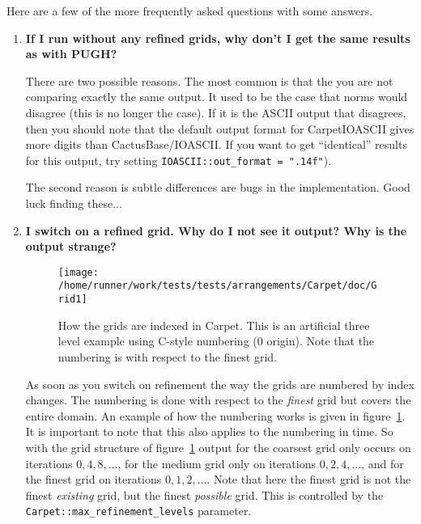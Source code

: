 Here are a few of the more frequently asked questions with some
answers.
\begin{enumerate}
\item \textbf{If I run without any refined grids, why don't I get the
    same results as with PUGH?}
  
  There are two possible reasons. The most common is that the you are
  not comparing exactly the same output. It used to be the case that
  norms would disagree (this is no longer the case). If it is the
  ASCII output that disagrees, then you should note that the default
  output format for CarpetIOASCII gives more digits than
  CactusBase/IOASCII. If you want to get ``identical'' results for
  this output, try setting \texttt{IOASCII::out\_format = ".14f"}).

  The second reason is subtle differences are bugs in the
  implementation. Good luck finding these...
\item \textbf{I switch on a refined grid. Why do I not see it output?
    Why is the output strange?} 

\begin{figure}[htbp]
  \begin{center}
    \texttt{[image: /home/runner/work/tests/tests/arrangements/Carpet/doc/Grid1]}
    \caption{How the grids are indexed in Carpet. This is an
      artificial three level example using C-style numbering (0
      origin). Note that the numbering is with respect to the finest
      grid.}
    \label{fig:Grid1}
  \end{center}
\end{figure}
  As soon as you switch on refinement the way the grids are numbered
  by index changes. The numbering is done with respect to the
  \textit{finest} grid but covers the entire domain. An example of how
  the numbering works is given in figure~\ref{fig:Grid1}. It is
  important to note that this also applies to the numbering in
  time. So with the grid structure of figure~\ref{fig:Grid1} output
  for the coarsest grid only occurs on iterations $0,4,8,\dots$, for
  the medium grid only on iterations $0,2,4,\dots$, and for the finest
  grid on iterations $0,1,2,\dots$. Note that here the finest grid is
  not the finest \textit{existing} grid, but the finest
  \textit{possible} grid. This is controlled by the
  \texttt{Carpet::max\_refinement\_levels} parameter.


\end{enumerate}
